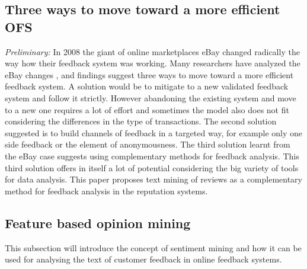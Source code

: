 \documentclass[a4paper, 11pt]{article}
\begin{document}
\subsection{Three ways to move toward a more efficient OFS}
\textit{Preliminary:} In 2008 the giant of online marketplaces eBay changed radically the way how their feedback system was working. Many researchers have analyzed the eBay changes \cite{fradkin2016bias,resnick2006value,bolton2013engineering,dini2009buying,dellarocas2008sound}, and findings suggest three ways to move toward a more efficient feedback system. A solution would be to mitigate to a new validated feedback system and follow it strictly. However abandoning the existing system and move to a new one requires a lot of effort and sometimes the model also does not fit considering the differences in the type of transactions. The second solution suggested is to build channels of feedback in a targeted way, for example only one side feedback or the element of anonymousness. The third solution learnt from the eBay case suggests using complementary methods for feedback analysis. This third solution offers in itself a lot of potential considering the big variety of tools for data analysis. This paper proposes text mining of reviews as a complementary method for feedback analysis in the reputation systems. 

\subsection{Feature based opinion mining}
This subsection will introduce the concept of sentiment mining and how it can be used for analysing the text of customer feedback in online feedback systems.
\end{document}
